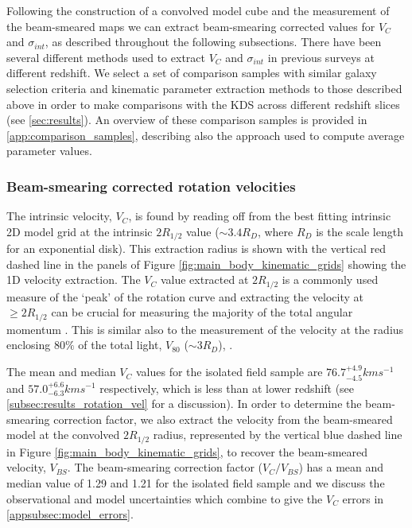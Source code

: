 \documentclass[fleqn,usenatbib]{mn2e}
\begin{document}
Following the construction of a convolved model cube and the measurement of the beam-smeared maps we can extract beam-smearing corrected values for $V_{C}$ and $\sigma_{int}$, as described throughout the following subsections.
There have been several different methods used to extract $V_{C}$ and $\sigma_{int}$ in previous surveys at different redshift.
We select a set of comparison samples with similar galaxy selection criteria and kinematic parameter extraction methods to those described above in order to make comparisons with the KDS across different redshift slices (see \cref{sec:results}).
An overview of these comparison samples is provided in \cref{app:comparison_samples}, describing also the approach used to compute average parameter values.

\subsubsection{Beam-smearing corrected rotation velocities}\label{subsubsec:beam_smearing_corrected_velocities}
The intrinsic velocity, $V_{C}$, is found by reading off from the best fitting intrinsic 2D model grid at the intrinsic $2R_{1/2}$ value ($\sim3.4R_{D}$, where $R_{D}$ is the scale length for an exponential disk).
This extraction radius is shown with the vertical red dashed line in the panels of Figure \ref{fig:main_body_kinematic_grids} showing the 1D velocity extraction.
The $V_{C}$ value extracted at $2R_{1/2}$ is a commonly used measure of the `peak' of the rotation curve \citep[e.g.][]{Miller2011,Pelliccia2016,Stott2016,Harrison2017,Swinbank2017} and extracting the velocity at $\geqslant 2R_{1/2}$ can be crucial for measuring the majority of the total angular momentum \citep[e.g.][]{Obreschkow2015,Harrison2017,Swinbank2017}.
This is similar also to the measurement of the velocity at the radius enclosing 80$\%$ of the total light, $V_{80}$ ($\sim3R_{D}$), \citep{Tiley2016a}.

The mean and median $V_{C}$ values for the isolated field sample are $76.7^{+4.9}_{-4.5}kms^{-1}$ and $57.0^{+6.6}_{-6.3}kms^{-1}$ respectively, which is less than at lower redshift (see \cref{subsec:results_rotation_vel} for a discussion).
In order to determine the beam-smearing correction factor, we also extract the velocity from the beam-smeared model at the convolved $2R_{1/2}$ radius, represented by the vertical blue dashed line in Figure \ref{fig:main_body_kinematic_grids}, to recover the beam-smeared velocity, $V_{BS}$.
The beam-smearing correction factor ($V_{C}/V_{BS}$) has a mean and median value of 1.29 and 1.21 for the isolated field sample and we discuss the observational and model uncertainties which combine to give the $V_{C}$ errors in \cref{appsubsec:model_errors}. \\
\end{document}
